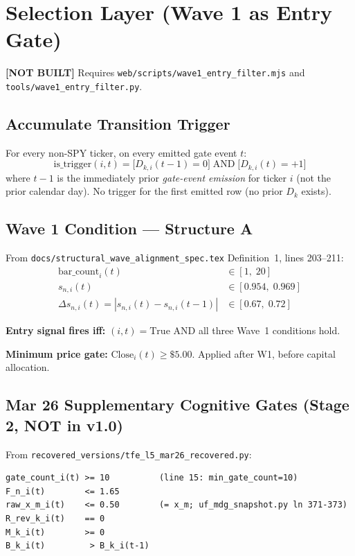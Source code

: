 \documentclass[11pt,a4paper]{article}
\newcommand{\statusnotbuilt}{\textcolor{statusnotbuilt}{\textbf{[NOT BUILT]}}}
\begin{document}
\section{Selection Layer (Wave 1 as Entry Gate)}

\statusnotbuilt{} Requires \texttt{web/scripts/wave1\_entry\_filter.mjs} and \texttt{tools/wave1\_entry\_filter.py}.

\subsection{Accumulate Transition Trigger}

For every non-SPY ticker, on every emitted gate event $t$:
\[
  \text{is\_trigger}(i, t) = \bigl[D_{k,i}(t{-}1) = 0\bigr] \;\text{AND}\; \bigl[D_{k,i}(t) = +1\bigr]
\]
where $t{-}1$ is the immediately prior \emph{gate-event emission} for ticker $i$ (not the prior calendar day). No trigger for the first emitted row (no prior $D_k$ exists).

\subsection{Wave 1 Condition — Structure A}

From \texttt{docs/structural\_wave\_alignment\_spec.tex} Definition~1, lines 203--211:
\begin{align}
  \text{bar\_count}_i(t) &\in [1,\;20] \tag{eq:newlisting}\\
  s_{n,i}(t) &\in [0.954,\;0.969] \tag{eq:ordered}\\
  \Delta s_{n,i}(t) = |s_{n,i}(t) - s_{n,i}(t{-}1)| &\in [0.67,\;0.72] \tag{eq:jump}
\end{align}

\textbf{Entry signal fires iff:} $(i,t) = \text{True}$ AND all three Wave~1 conditions hold.

\textbf{Minimum price gate:} $\text{Close}_i(t) \geq \$5.00$. Applied after W1, before capital allocation.

\subsection{Mar 26 Supplementary Cognitive Gates (Stage 2, NOT in v1.0)}

From \texttt{recovered\_versions/tfe\_l5\_mar26\_recovered.py}:

\begin{lstlisting}
gate_count_i(t) >= 10          (line 15: min_gate_count=10)
F_n_i(t)        <= 1.65
raw_x_m_i(t)    <= 0.50        (= x_m; uf_mdg_snapshot.py ln 371-373)
R_rev_k_i(t)    == 0
M_k_i(t)        >= 0
B_k_i(t)         > B_k_i(t-1)
\end{lstlisting}
\end{document}
